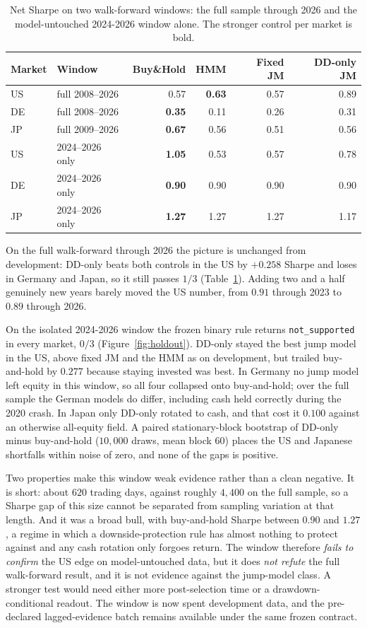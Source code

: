 \documentclass[11pt]{article}
\newcommand{\BH}{Buy\&Hold}
\begin{document}
\begin{table}[!htbp]
\centering
\caption{Net Sharpe on two walk-forward windows: the full sample through 2026
and the model-untouched 2024-2026 window alone. The stronger control per market
is bold.}
\label{tab:holdout}
\small
\begin{tabular}{llrrrr}
\toprule
Market & Window & \BH{} & HMM & Fixed JM & DD-only JM \\
\midrule
US & full 2008--2026   & 0.57 & \textbf{0.63} & 0.57 & 0.89 \\
DE & full 2008--2026   & \textbf{0.35} & 0.11 & 0.26 & 0.31 \\
JP & full 2009--2026   & \textbf{0.67} & 0.56 & 0.51 & 0.56 \\
\addlinespace
US & 2024--2026 only   & \textbf{1.05} & 0.53 & 0.57 & 0.78 \\
DE & 2024--2026 only   & \textbf{0.90} & 0.90 & 0.90 & 0.90 \\
JP & 2024--2026 only   & \textbf{1.27} & 1.27 & 1.27 & 1.17 \\
\bottomrule
\end{tabular}
\end{table}

On the full walk-forward through 2026 the picture is unchanged from
development: DD-only beats both controls in the US by \(+0.258\) Sharpe and
loses in Germany and Japan, so it still passes \(1/3\)
(Table~\ref{tab:holdout}). Adding two and a half genuinely new years barely
moved the US number, from \(0.91\) through 2023 to \(0.89\) through 2026.

On the isolated 2024-2026 window the frozen binary rule returns
\texttt{not\_supported} in every market, \(0/3\) (Figure~\ref{fig:holdout}).
DD-only stayed the best jump model in the US, above fixed JM and the HMM as on
development, but trailed buy-and-hold by \(0.277\) because staying invested was
best. In Germany no jump model left equity in this window, so all four
collapsed onto buy-and-hold; over the full sample the German models do differ,
including cash held correctly during the 2020 crash. In Japan only DD-only
rotated to cash, and that cost it \(0.100\) against an otherwise all-equity
field. A paired stationary-block bootstrap of DD-only minus buy-and-hold
(\(10{,}000\) draws, mean block 60) places the US and Japanese shortfalls
within noise of zero, and none of the gaps is positive.

Two properties make this window weak evidence rather than a clean negative.
It is short: about \(620\) trading days, against roughly \(4{,}400\) on the
full sample, so a Sharpe gap of this size cannot be separated from sampling
variation at that length. And it was a broad bull, with buy-and-hold Sharpe
between \(0.90\) and
\(1.27\), a regime in which a downside-protection rule has almost nothing to
protect against and any cash rotation only forgoes return. The window therefore
\emph{fails to confirm} the US edge on model-untouched data, but it does
\emph{not refute} the full walk-forward result, and it is not evidence against
the jump-model class. A stronger test would need either more post-selection
time or a drawdown-conditional readout. The window is now spent development
data, and the pre-declared lagged-evidence batch remains available under the
same frozen contract.
\end{document}
